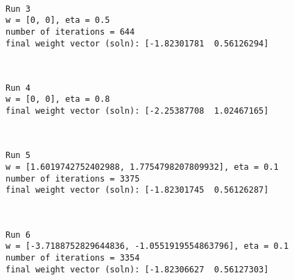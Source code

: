 \documentclass[11pt]{article}
\begin{document}
    \begin{center}
    \end{center}
    { \hspace*{\fill} \\}
    
    \begin{Verbatim}[commandchars=\\\{\}]
Run 3
w = [0, 0], eta = 0.5
number of iterations = 644
final weight vector (soln): [-1.82301781  0.56126294]

    \end{Verbatim}

    \begin{center}
    \end{center}
    { \hspace*{\fill} \\}
    
    \begin{Verbatim}[commandchars=\\\{\}]
Run 4
w = [0, 0], eta = 0.8
final weight vector (soln): [-2.25387708  1.02467165]

    \end{Verbatim}

    \begin{center}
    \end{center}
    { \hspace*{\fill} \\}
    
    \begin{Verbatim}[commandchars=\\\{\}]
Run 5
w = [1.6019742752402988, 1.7754798207809932], eta = 0.1
number of iterations = 3375
final weight vector (soln): [-1.82301745  0.56126287]

    \end{Verbatim}

    \begin{center}
    \end{center}
    { \hspace*{\fill} \\}
    
    \begin{Verbatim}[commandchars=\\\{\}]
Run 6
w = [-3.7188752829644836, -1.0551919554863796], eta = 0.1
number of iterations = 3354
final weight vector (soln): [-1.82306627  0.56127303]

    \end{Verbatim}
\end{document}
